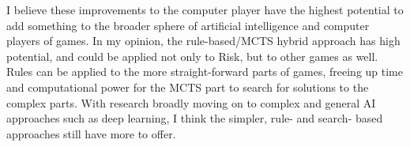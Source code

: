I believe these improvements to the computer player have the highest potential to add something to the broader sphere of artificial intelligence and computer players of games. In my opinion, the rule-based/MCTS hybrid approach has high potential, and could be applied not only to Risk, but to other games as well. Rules can be applied to the more straight-forward parts of games, freeing up time and computational power for the MCTS part to search for solutions to the complex parts. With research broadly moving on to complex and general AI approaches such as deep learning, I think the simpler, rule- and search- based approaches still have more to offer.